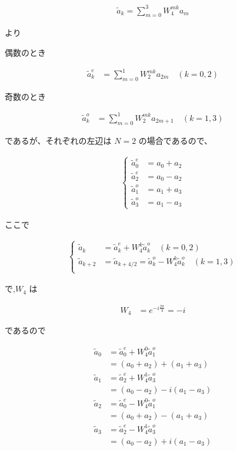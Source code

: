\begin{align}
    \tilde{a}_k = \sum_{m = 0}^3 W_4^{mk} a_m
\end{align}

より

偶数のとき

\begin{align*}
    \tilde{a}_k^{e} &= \sum_{m = 0}^1 W_2^{mk} a_{2m} \quad(k = 0,2)
\end{align*}

奇数のとき

\begin{align*}
    \tilde{a}_k^{o} &= \sum_{m = 0}^1 W_2^{mk} a_{2m + 1} \quad(k = 1,3)
\end{align*}

であるが、それぞれの左辺は $N = 2$ の場合であるので、

\begin{align}
    \begin{cases}
        \tilde{a}_0^{e} &= a_0 + a_2 \\ 
        \tilde{a}_2^{e} &= a_0 - a_2 \\
        \tilde{a}_1^{o} &= a_1 + a_3 \\
        \tilde{a}_3^{o} &= a_1 - a_3
    \end{cases}
\end{align}

ここで

\begin{align}
    \begin{cases}
        \tilde{a}_k &= \tilde{a}_k^{e} + W_4^k \tilde{a}_k^{o} \quad(k = 0,2) \\
        \tilde{a}_{k + 2} &= \tilde{a}_{k + 4/2} = \tilde{a}_k^{o} - W_4^k \tilde{a}_k^{o} \quad (k = 1,3) \\
    \end{cases}
\end{align}

で,$W_4$ は

\begin{align*}
    W_4 &= e^{-i\frac{2\pi}{4}} = -i
\end{align*}

であるので

\begin{align*}
    \tilde{a}_0 &= \tilde{a}_0^e + W_4^0 \tilde{a}_1^o \\
                &= (a_0 + a_2) + (a_1 + a_3) \\
    \tilde{a}_1 &= \tilde{a}_2^e + W_4^1 \tilde{a}_3^o \\
                &= (a_0 - a_2) - i (a_1 - a_3) \\
    \tilde{a}_2 &= \tilde{a}_0^e - W_4^0 \tilde{a}_1^o \\
                &= (a_0 + a_2) - (a_1 + a_3) \\
    \tilde{a}_3 &= \tilde{a}_2^e - W_4^1 \tilde{a}_3^o \\
                &= (a_0 - a_2) + i(a_1 - a_3)
\end{align*}
